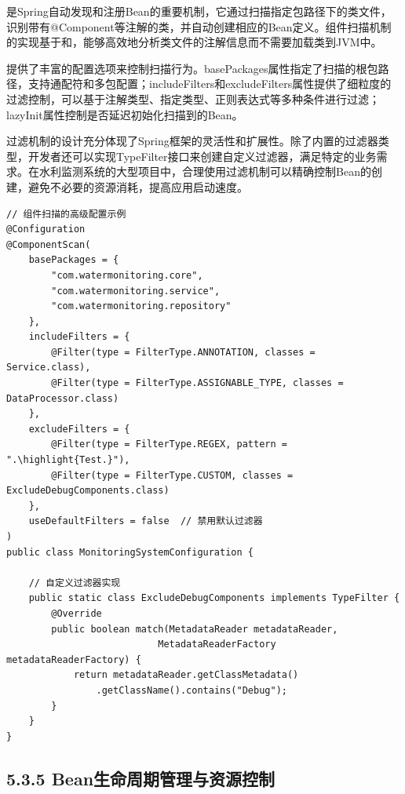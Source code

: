是Spring自动发现和注册Bean的重要机制，它通过扫描指定包路径下的类文件，识别带有@Component等注解的类，并自动创建相应的Bean定义。组件扫描机制的实现基于和，能够高效地分析类文件的注解信息而不需要加载类到JVM中。

提供了丰富的配置选项来控制扫描行为。basePackages属性指定了扫描的根包路径，支持通配符和多包配置；includeFilters和excludeFilters属性提供了细粒度的过滤控制，可以基于注解类型、指定类型、正则表达式等多种条件进行过滤；lazyInit属性控制是否延迟初始化扫描到的Bean。

过滤机制的设计充分体现了Spring框架的灵活性和扩展性。除了内置的过滤器类型，开发者还可以实现TypeFilter接口来创建自定义过滤器，满足特定的业务需求。在水利监测系统的大型项目中，合理使用过滤机制可以精确控制Bean的创建，避免不必要的资源消耗，提高应用启动速度。

\begin{lstlisting}[style=java]
// 组件扫描的高级配置示例
@Configuration
@ComponentScan(
    basePackages = {
        "com.watermonitoring.core",
        "com.watermonitoring.service",
        "com.watermonitoring.repository"
    },
    includeFilters = {
        @Filter(type = FilterType.ANNOTATION, classes = Service.class),
        @Filter(type = FilterType.ASSIGNABLE_TYPE, classes = DataProcessor.class)
    },
    excludeFilters = {
        @Filter(type = FilterType.REGEX, pattern = ".\highlight{Test.}"),
        @Filter(type = FilterType.CUSTOM, classes = ExcludeDebugComponents.class)
    },
    useDefaultFilters = false  // 禁用默认过滤器
)
public class MonitoringSystemConfiguration {
    
    // 自定义过滤器实现
    public static class ExcludeDebugComponents implements TypeFilter {
        @Override
        public boolean match(MetadataReader metadataReader, 
                           MetadataReaderFactory metadataReaderFactory) {
            return metadataReader.getClassMetadata()
                .getClassName().contains("Debug");
        }
    }
}
\end{lstlisting}

\hypertarget{beanux751fux547dux5468ux671fux7ba1ux7406ux4e0eux8d44ux6e90ux63a7ux5236}{%
\subsection{5.3.5 Bean生命周期管理与资源控制}\label{beanux751fux547dux5468ux671fux7ba1ux7406ux4e0eux8d44ux6e90ux63a7ux5236}}

